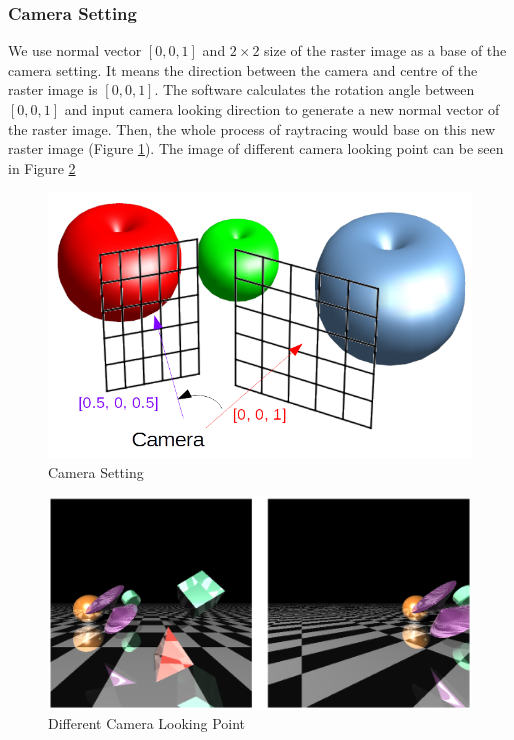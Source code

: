 \documentclass[a4paper, 12pt]{article}
\begin{document}
\subsubsection{Camera Setting}
We use normal vector $[0, 0, 1]$ and $2\times2$ size of the raster image as a base of the camera setting. It means the direction between the camera and centre of the raster image is $[0, 0, 1]$. The software calculates the rotation angle between $[0, 0, 1]$ and input camera looking direction to generate a new normal vector of the raster image. Then, the whole process of raytracing would base on this new raster image (Figure \ref{fig:Camera Setting}). The image of different camera looking point can be seen in Figure \ref{fig:Camera_Dif}

\begin{figure}[H]
\centering
\includegraphics[width=0.6\linewidth]{Camera_Setting.png}
\caption{Camera Setting}
\label{fig:Camera Setting}
\end{figure}

\begin{figure}[H]
\centering
\includegraphics[width=0.6\linewidth]{Camera_Dif.png}
\caption{Different Camera Looking Point}
\label{fig:Camera_Dif}
\end{figure}
\end{document}
